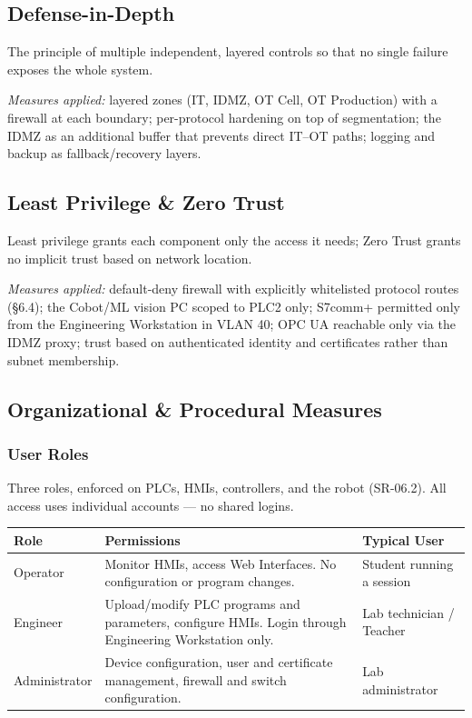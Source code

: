 \documentclass[11pt,a4paper]{article}
\renewcommand{\arraystretch}{1.15}
\begin{document}
\subsection{Defense-in-Depth}
The principle of multiple independent, layered controls so that no single
failure exposes the whole system.

\textit{Measures applied:} layered zones (IT, IDMZ, OT Cell, OT Production)
with a firewall at each boundary; per-protocol hardening on top of
segmentation; the IDMZ as an additional buffer that prevents direct IT--OT
paths; logging and backup as fallback/recovery layers.

\subsection{Least Privilege \& Zero Trust}
Least privilege grants each component only the access it needs; Zero Trust
grants no implicit trust based on network location.

\textit{Measures applied:} default-deny firewall with explicitly whitelisted
protocol routes (\S6.4); the Cobot/ML vision PC scoped to PLC2 only; S7comm+
permitted only from the Engineering Workstation in VLAN 40; OPC UA reachable
only via the IDMZ proxy; trust based on authenticated identity and certificates
rather than subnet membership.


\subsection{Organizational \& Procedural Measures}

\subsubsection{User Roles}
Three roles, enforced on PLCs, HMIs, controllers, and the robot (SR-06.2). All access uses individual accounts — no shared logins. \\

\renewcommand{\arraystretch}{1.3} %
\begin{tabularx}{\textwidth}{p{2.5cm} X X}
    \textbf{Role} & \textbf{Permissions} & \textbf{Typical User} \vspace{0.5em}\\
\toprule
    Operator & Monitor HMIs, access Web Interfaces. No configuration or program changes. & Student running a session \\
    \midrule
    Engineer & Upload/modify PLC programs and parameters, configure HMIs. Login through Engineering Workstation only. & Lab technician / Teacher \\
    \midrule
    Administrator &  Device configuration, user and certificate management, firewall and switch configuration. &  Lab administrator \\
    \bottomrule
\end{tabularx}
\vspace{1em}
\end{document}
